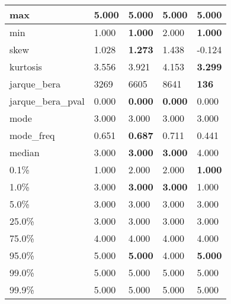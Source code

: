 \begin{table}[H]
\begin{tabular}{|l|m{10em}|m{10em}|m{10em}|m{10em}|}
\hline max & 5.000 & 5.000 & 5.000 & 5.000 \\
\hline min & 1.000 & \bfseries 1.000 & \cellcolor[rgb]{0.9, 0.54, 0.52} 2.000 & \bfseries 1.000 \\
\hline skew & 1.028 & \bfseries 1.273 & 1.438 & \cellcolor[rgb]{0.9, 0.54, 0.52} -0.124 \\
\hline kurtosis & 3.556 & 3.921 & \cellcolor[rgb]{0.9, 0.54, 0.52} 4.153 & \bfseries 3.299 \\
\hline jarque\_bera & 3269 & 6605 & \cellcolor[rgb]{0.9, 0.54, 0.52} 8641 & \bfseries 136 \\
\hline jarque\_bera\_pval & 0.000 & \bfseries 0.000 & \bfseries 0.000 & \cellcolor[rgb]{0.9, 0.54, 0.52} 0.000 \\
\hline mode & 3.000 & 3.000 & 3.000 & 3.000 \\
\hline mode\_freq & 0.651 & \bfseries 0.687 & 0.711 & \cellcolor[rgb]{0.9, 0.54, 0.52} 0.441 \\
\hline median & 3.000 & \bfseries 3.000 & \bfseries 3.000 & \cellcolor[rgb]{0.9, 0.54, 0.52} 4.000 \\
\hline 0.1\% & 1.000 & \cellcolor[rgb]{0.9, 0.54, 0.52} 2.000 & \cellcolor[rgb]{0.9, 0.54, 0.52} 2.000 & \bfseries 1.000 \\
\hline 1.0\% & 3.000 & \bfseries 3.000 & \bfseries 3.000 & \cellcolor[rgb]{0.9, 0.54, 0.52} 1.000 \\
\hline 5.0\% & 3.000 & 3.000 & 3.000 & 3.000 \\
\hline 25.0\% & 3.000 & 3.000 & 3.000 & 3.000 \\
\hline 75.0\% & 4.000 & 4.000 & 4.000 & 4.000 \\
\hline 95.0\% & 5.000 & \bfseries 5.000 & \cellcolor[rgb]{0.9, 0.54, 0.52} 4.000 & \bfseries 5.000 \\
\hline 99.0\% & 5.000 & 5.000 & 5.000 & 5.000 \\
\hline 99.9\% & 5.000 & 5.000 & 5.000 & 5.000 \\
\hline
\end{tabular}
\end{table}
